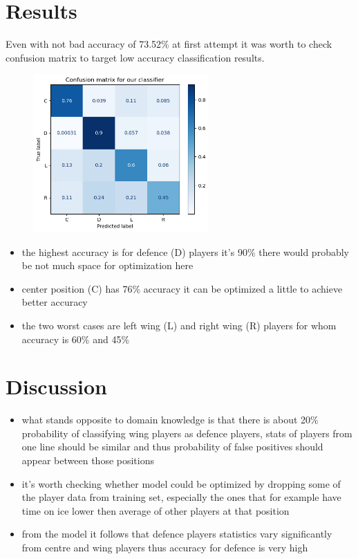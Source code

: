 \section{Results}
	Even with not bad accuracy of 73.52\% at first attempt it was worth to check confusion matrix to target low accuracy classification results.
	
	\begin{figure}[H]
        \includegraphics[width=0.6\textwidth]{matrix}
    \end{figure}
	
	\begin{itemize}
		\item the highest accuracy is for defence (D) players it's 90\% there would probably be not much space for optimization here
		\item center position (C) has 76\% accuracy it can be optimized a little to achieve better accuracy
		\item the two worst cases are left wing (L) and right wing (R) players for whom accuracy is 60\% and 45\%
	\end{itemize}
	
	\section{Discussion}
	\begin{itemize}
		\item what stands opposite to domain knowledge is that there is about 20\% probability of classifying wing players as defence players, stats of players from one line should be similar and thus probability of false positives should appear between those positions
		\item it's worth checking whether model could be optimized by dropping some of the player data from training set, especially the ones that for example have time on ice lower then average of other players at that position
		\item from the model it follows that defence players statistics vary significantly from centre and wing players thus accuracy for defence is very high
		
	\end{itemize} 
